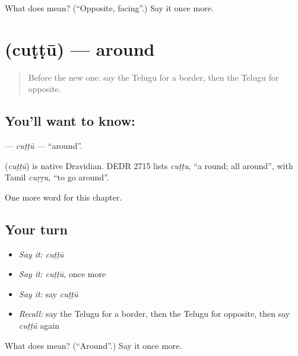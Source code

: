\begin{tcolorbox}[breakable,colback=teal!4,colframe=teal!35!black,title={Before you move on}]
What does  mean? (\textquotedblleft{}Opposite, facing\textquotedblright{}.) Say it once more.
\end{tcolorbox}
\section[\texorpdfstring{\te{చుట్టూ} (cuṭṭū)}{చుట్టూ (cuṭṭū)}]{ (cuṭṭū) — around}

\label{lesson:TE-C291-cuttu2}



\begin{quote}
Before the new one: say the Telugu for a border, then the Telugu for opposite.
\end{quote}

\subsection*{You'll want to know: }
\textbf{} — \emph{cuṭṭū} — \textquotedblleft{}around\textquotedblright{}.

\begin{cousinweb}
\textbf{} (\emph{cuṭṭū}) is native Dravidian. DEDR 2715 lists \emph{cuṭṭu}, \textquotedblleft{}a round; all around\textquotedblright{}, with Tamil \emph{cuṟṟu}, \textquotedblleft{}to go around\textquotedblright{}.
\end{cousinweb}

\begin{grammarlens}[title={What you've built}]
One more word for this chapter.
\end{grammarlens}

\subsection*{Your turn}
\begin{itemize}
\raggedright
  \item \emph{Say it:} \emph{cuṭṭū}
  \item \emph{Say it:} \emph{cuṭṭū}, once more
  \item \emph{Say it:} say \emph{cuṭṭū}
  \item \emph{Recall:} say the Telugu for a border, then the Telugu for opposite, then say \emph{cuṭṭū} again
\end{itemize}

\begin{tcolorbox}[breakable,colback=teal!4,colframe=teal!35!black,title={Before you move on}]
What does  mean? (\textquotedblleft{}Around\textquotedblright{}.) Say it once more.
\end{tcolorbox}
